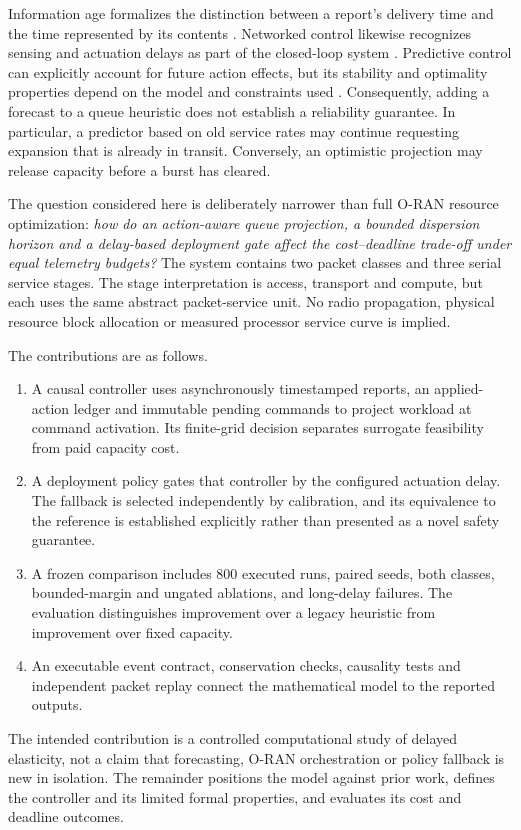 \documentclass[10pt,a4paper]{article}
\begin{document}
Information age formalizes the distinction between a report's delivery time and
the time represented by its contents \cite{age}. Networked control likewise
recognizes sensing and actuation delays as part of the closed-loop system
\cite{networked}. Predictive control can explicitly account for future action
effects, but its stability and optimality properties depend on the model and
constraints used \cite{mpc}. Consequently, adding a forecast to a queue heuristic
does not establish a reliability guarantee. In particular, a predictor based on
old service rates may continue requesting expansion that is already in transit.
Conversely, an optimistic projection may release capacity before a burst has
cleared.

The question considered here is deliberately narrower than full O-RAN resource
optimization: \emph{how do an action-aware queue projection, a bounded dispersion
horizon and a delay-based deployment gate affect the cost--deadline trade-off
under equal telemetry budgets?} The system contains two packet classes and three
serial service stages. The stage interpretation is access, transport and compute,
but each uses the same abstract packet-service unit. No radio propagation,
physical resource block allocation or measured processor service curve is implied.

The contributions are as follows.
\begin{enumerate}
\item A causal controller uses asynchronously timestamped reports, an applied-action
ledger and immutable pending commands to project workload at command activation.
Its finite-grid decision separates surrogate feasibility from paid capacity cost.
\item A deployment policy gates that controller by the configured actuation delay.
The fallback is selected independently by calibration, and its equivalence to the
reference is established explicitly rather than presented as a novel safety guarantee.
\item A frozen comparison includes 800 executed runs, paired seeds, both classes,
bounded-margin and ungated ablations, and long-delay failures. The evaluation
distinguishes improvement over a legacy heuristic from improvement over fixed capacity.
\item An executable event contract, conservation checks, causality tests and
independent packet replay connect the mathematical model to the reported outputs.
\end{enumerate}
The intended contribution is a controlled computational study of delayed
elasticity, not a claim that forecasting, O-RAN orchestration or policy fallback
is new in isolation. The remainder positions the model against prior work,
defines the controller and its limited formal properties, and evaluates its
cost and deadline outcomes.
\end{document}
